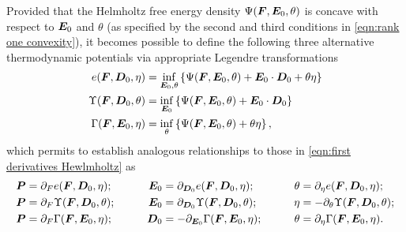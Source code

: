 Provided that the Helmholtz free energy density $\Psi(\boldsymbol{F},\boldsymbol{E}_0,\theta)$ is concave with respect to $\boldsymbol{E}_0$ and $\theta$ (as specified by the second and third conditions in \eqref{eqn:rank one convexity}), it becomes possible to define the following three alternative thermodynamic potentials via appropriate Legendre transformations
%
\begin{equation}\label{eqn:other potentials}
\begin{aligned}
e(\vect{F},\vect{D}_0,\eta) & =  \inf_{\vect{E}_0,\theta}\left\{\Psi(\vect{F},\vect{E}_0,\theta) + \vect{E}_0\cdot\vect{D}_0 + \theta \eta \right\}\\
%
\Upsilon(\vect{F},\vect{D}_0,\theta) & =  \inf_{\vect{E}_0}\left\{\Psi(\vect{F},\vect{E}_0,\theta) + \vect{E}_0\cdot\vect{D}_0\right\}\\
%
\Gamma(\vect{F},\vect{E}_0,\eta) & =  \inf_{\theta}\left\{\Psi(\vect{F},\vect{E}_0,\theta) + \theta \eta \right\},
\end{aligned}	
\end{equation}
%
which permits to establish analogous relationships to those in \eqref{eqn:first derivatives Hewlmholtz} as
%
\begin{equation}\label{eqn:piola alternative}
\begin{aligned}
\vect{P}& = \partial_{F}e(\vect{F},\vect{D}_0,\eta);&\qquad  \vect{E}_0& = \partial_{\vect{D}_0}e(\vect{F},\vect{D}_0,\eta);&\qquad  \theta &= \partial_{\eta}e(\vect{F},\vect{D}_0,\eta);\\
%
%
\vect{P} &= \partial_{F}\Upsilon(\vect{F},\vect{D}_0,\theta);&\qquad  \vect{E}_0 &= \partial_{\vect{D}_0}\Upsilon(\vect{F},\vect{D}_0,\theta);&\qquad  \eta &= -\partial_{\theta}\Upsilon(\vect{F},\vect{D}_0,\theta);\\
%
%
\vect{P} &= \partial_{F}\Gamma(\vect{F},\vect{E}_0,\eta);&\qquad  \vect{D}_0& = -\partial_{\vect{E}_0}\Gamma(\vect{F},\vect{E}_0,\eta);&\qquad  \theta& = \partial_{\eta}\Gamma(\vect{F},\vect{E}_0,\eta).
\end{aligned}	
\end{equation} 


